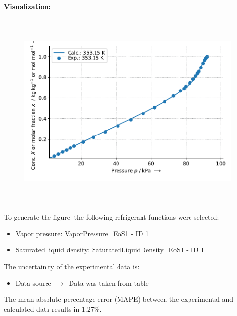 \textbf{Visualization:}
%
\begin{figure}[!htp]
{\noindent\includegraphics[height=10cm, keepaspectratio]{figs/abs/abs_2-Propanol_ionic_liquid_[EMIM]+[(CF3SO2)2N]-_NrtlFixedDg_1.pdf}}
\end{figure}
%

To generate the figure, the following refrigerant functions were selected:
\begin{itemize}
\item Vapor pressure: VaporPressure\_EoS1 - ID 1
\item Saturated liquid density: SaturatedLiquidDensity\_EoS1 - ID 1
\end{itemize}

The uncertainity of the experimental data is:
\begin{itemize}
\item Data source $\,\to\,$ Data was taken from table
\end{itemize}

The mean absolute percentage error (MAPE) between the experimental and calculated data results in 1.27\%.
\FloatBarrier
\newpage

